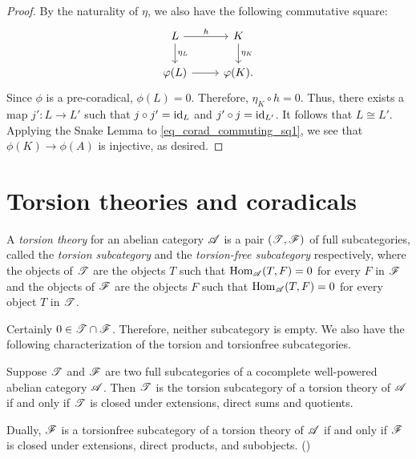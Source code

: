 \begin{proof}
By the naturality of $\eta$, we also have the following 
commutative square:
\[
\begin{tikzcd}
L \arrow{r}{h} \arrow{d}{\eta_L}&
K \arrow{d}{\eta_K} \\
\phi(L) \arrow{r} &
\phi(K).
\end{tikzcd}
\]
Since $\phi$ is a pre-coradical, $\phi(L) = 0$. Therefore,
$\eta_K \circ h = 0$. Thus, there exists a map $j': L \to L'$
such that $j\circ j' = \mathrm{id}_{L}$ and $j'\circ j = \mathrm{id}_{L'}$.
It follows that $L \cong L'$. Applying the Snake Lemma to
\eqref{eq_corad_commuting_sq1}, we see that $\phi(K) \to
\phi(A)$ is injective, as desired.
\end{proof}

\section{Torsion theories and coradicals}
\label{sect_tt_and_corads}

\begin{defn}
A \emph{torsion theory} for an abelian category $\mathscr{A}$ is a 
pair $(\mathscr{T}, \mathscr{F})$ of full subcategories,
called the \emph{torsion subcategory} and the \emph{torsion-free 
subcategory} respectively, where the objects of $\mathscr{T}$ are
the objects $T$ such that $\mathrm{Hom}_{\mathscr{A}}(T, F) = 0$ for every $F$
in $\mathscr{F}$ and the objects of $\mathscr{F}$ are the objects $F$ such 
that $\mathrm{Hom}_{\mathscr{A}}(T, F) = 0$ for every object $T$ in $\mathscr{T}$.
\end{defn}

Certainly $0 \in \mathscr{T} \cap \mathscr{F}$. Therefore, neither 
subcategory is empty. We also have the following characterization
of the torsion and torsionfree subcategories. 

\begin{prop}\label{prop_tt_properties}
Suppose $\mathscr{T}$ and $\mathscr{F}$ are two full subcategories of a
cocomplete well-powered abelian category $\mathscr{A}$. Then 
$\mathscr{T}$ is the torsion subcategory of a torsion theory of 
$\mathscr{A}$ if and only if $\mathscr{T}$ is closed under extensions, 
direct sums and quotients.

Dually, $\mathscr{F}$ is a torsionfree subcategory of a torsion theory
of $\mathscr{A}$ if and only if $\mathscr{F}$ is closed under extensions, 
direct products, and subobjects. (\CF \cite[I2.6]{BJV})
\end{prop}

